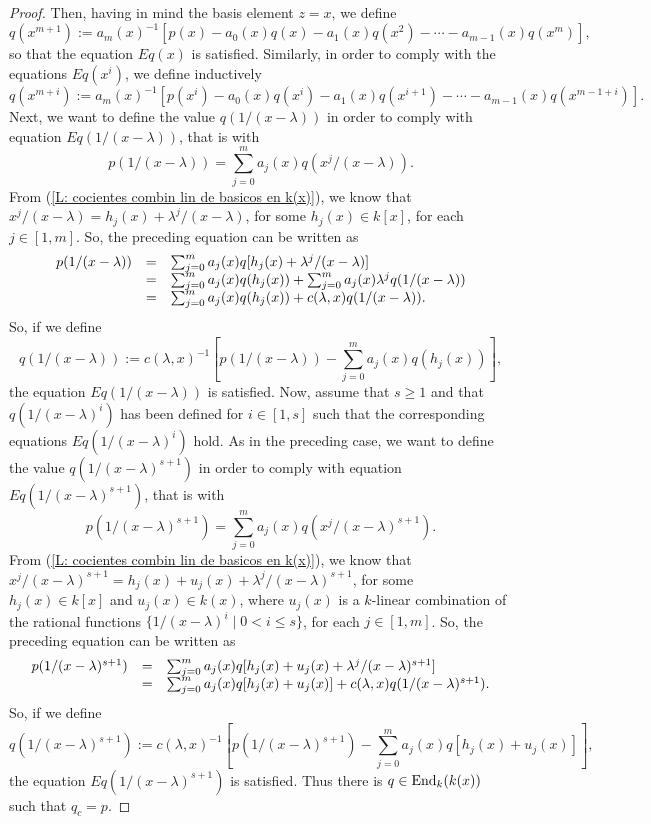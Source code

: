 \documentclass{article}
\theoremstyle{definition}
\newcommand{\End}{{ \rm End }}
\begin{document}
\begin{proof}
Then, having in mind the basis element $z=x$,  we define 
$$q(x^{m+1}):=a_m(x)^{-1}[p(x)-a_0(x)q(x)-a_1(x)q(x^2)-\cdots -a_{m-1}(x)q(x^m)],$$
so that the equation $Eq(x)$ is satisfied. Similarly, in order to comply with the equations $Eq(x^i)$, we define inductively 
$$q(x^{m+i}):=a_m(x)^{-1}[p(x^i)-a_0(x)q(x^i)-a_1(x)q(x^{i+1})-\cdots -a_{m-1}(x)q(x^{m-1+i})].$$
Next, we want to define the value $q(1/(x-\lambda))$ in order to comply with equation $Eq(1/(x-\lambda))$, that is with 
$$p(1/(x-\lambda))=\sum_{j=0}^ma_j(x)q(x^j/(x-\lambda)).$$
From (\ref{L: cocientes combin lin de basicos en k(x)}), we know that $x^j/(x-\lambda)=h_j(x)+\lambda^j/(x-\lambda)$, for some $h_j(x)\in k[x]$, for each $j\in [1,m]$. So, the preceding equation can be written as 
$$\begin{matrix}
p(1/(x-\lambda))
&=&
\sum_{j=0}^ma_j(x)q[h_j(x)+\lambda^j/(x-\lambda)]\hfill\\
&=&
\sum_{j=0}^ma_j(x)q(h_j(x)) +\sum_{j=0}^ma_j(x)\lambda^jq(1/(x-\lambda))\hfill\\
&=&
\sum_{j=0}^ma_j(x)q(h_j(x)) +c(\lambda,x)q(1/(x-\lambda)).\hfill\\
\end{matrix}
$$
So, if we define 
$$q(1/(x-\lambda)):=c(\lambda,x)^{-1}\left[p(1/(x-\lambda))-\sum_{j=0}^ma_j(x)q(h_j(x))\right],$$
the equation $Eq(1/(x-\lambda))$ is satisfied. Now, assume that $s\geq 1$ and that $q(1/(x-\lambda)^i)$ has been defined for $i\in [1,s]$ such that the corresponding equations $Eq(1/(x-\lambda)^i)$ hold. As in the preceding case, we 
want to define the value $q(1/(x-\lambda)^{s+1})$ in order to comply with equation $Eq(1/(x-\lambda)^{s+1})$, that is with 
$$p(1/(x-\lambda)^{s+1})=\sum_{j=0}^ma_j(x)q(x^j/(x-\lambda)^{s+1}).$$
From (\ref{L: cocientes combin lin de basicos en k(x)}), we know that $x^j/(x-\lambda)^{s+1}=h_j(x)+u_j(x)+\lambda^j/(x-\lambda)^{s+1}$, for some $h_j(x)\in k[x]$ and $u_j(x)\in k(x)$, where $u_j(x)$ is a $k$-linear combination of the rational functions $\{1/(x-\lambda)^i\mid 0<i\leq s\}$, for each $j\in [1,m]$. So, the preceding equation can be written as 
$$\begin{matrix}
p(1/(x-\lambda)^{s+1})
&=&
\sum_{j=0}^ma_j(x)q[h_j(x)+u_j(x)+\lambda^j/(x-\lambda)^{s+1}]\hfill\\
&=&
\sum_{j=0}^ma_j(x)q[h_j(x)+u_j(x)] +c(\lambda,x)q(1/(x-\lambda)^{s+1}).\hfill\\
\end{matrix}
$$
So, if we define 
$$q(1/(x-\lambda)^{s+1}):=c(\lambda,x)^{-1}\left[p(1/(x-\lambda)^{s+1})-\sum_{j=0}^ma_j(x)q[h_j(x)+u_j(x)]\right],$$
the equation $Eq(1/(x-\lambda)^{s+1})$ is satisfied. Thus there is $q\in \End_k(k(x))$ such that $q_c=p$. 
 \medskip


\end{proof}
\end{document}
